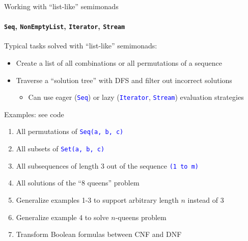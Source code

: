 \documentclass[english]{beamer}
\begin{document}
\begin{frame}{Working with ``list-like'' semimonads}


\framesubtitle{\texttt{\footnotesize{}Seq}, \texttt{\footnotesize{}NonEmptyList},
\texttt{\footnotesize{}Iterator}, \texttt{\footnotesize{}Stream}}

Typical tasks solved with ``list-like'' semimonads:
\begin{itemize}
\item Create a list of all combinations or all permutations of a sequence
\item Traverse a ``solution tree'' with DFS and filter out incorrect solutions
\begin{itemize}
\item Can use eager (\texttt{\textcolor{blue}{\footnotesize{}Seq}}) or lazy
(\texttt{\textcolor{blue}{\footnotesize{}Iterator}}, \texttt{\textcolor{blue}{\footnotesize{}Stream}})
evaluation strategies
\end{itemize}
\end{itemize}
Examples: see code
\begin{enumerate}
\item All permutations of \texttt{\textcolor{blue}{\footnotesize{}Seq(\textquotedbl{}a\textquotedbl{},
\textquotedbl{}b\textquotedbl{}, \textquotedbl{}c\textquotedbl{})}} 
\item All subsets of \texttt{\textcolor{blue}{\footnotesize{}Set(\textquotedbl{}a\textquotedbl{},
\textquotedbl{}b\textquotedbl{}, \textquotedbl{}c\textquotedbl{})}} 
\item All subsequences of length 3 out of the sequence \texttt{\textcolor{blue}{\footnotesize{}(1
to m)}} 
\item All solutions of the ``8 queens'' problem
\item Generalize examples 1-3 to support arbitrary length $n$ instead of
3
\item Generalize example 4 to solve $n$-queens problem
\item Transform Boolean formulas between CNF and DNF 
\end{enumerate}
\end{frame}
\end{document}
